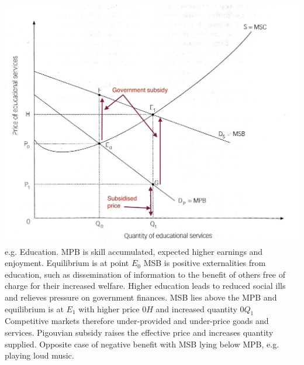 \documentclass[12pt]{examnotes}
\begin{document}
\includegraphics[scale=0.3]{./imgs/34.jpg}
\ra e.g. Education.
\ra MPB is skill accumulated, expected higher earnings and enjoyment.
\ra Equilibrium is at point $E_0$
\ra MSB is positive externalities from education, such as dissemination of information to the benefit of others free of charge for their increased welfare. Higher education leads to reduced social ills and relieves pressure on government finances.
\ra MSB lies above the MPB and equilibrium is at $E_1$ with higher price $0H$ and increased quantity $0Q_1$
\ra Competitive markets therefore under-provided and under-price goads and services.
\ra Pigouvian subsidy raises the effective price and increases quantity supplied.
\ra Opposite case of negative benefit with MSB lying below MPB, e.g. playing loud music.
\end{document}
